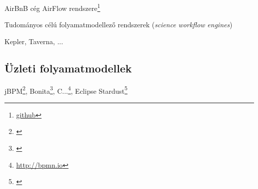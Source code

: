 AirBnB cég AirFlow rendszere\footnote{\url{github}}

Tudományos célú folyamatmodellező rendszerek (\emph{science workflow engines})

Kepler, Taverna, ...

\subsection{Üzleti folyamatmodellek}

jBPM\footnote{\url{}}, Bonita\footnote{\url{}}, C...\footnote{\url{http://bpmn.io}}, Eclipse Stardust\footnote{\url{}}

